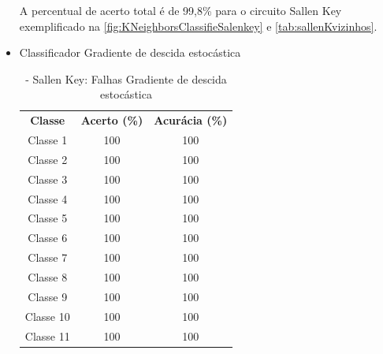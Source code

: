 \begin{itemize}
A percentual de acerto total é de 99,8\% para o circuito Sallen Key exemplificado na \ref{fig:KNeighborsClassifieSalenkey} e \ref{tab:sallenKvizinhos}. 
\newpage

 \item Classificador Gradiente de descida estocástica
 
 \begin{table}[ht]
\centering
\begin{tabular}{ccc}
\textbf{Classe} & \textbf{Acerto (\%)} & \textbf{Acurácia (\%)} \\
Classe 1        & 100                  & 100                    \\
Classe 2        & 100                  & 100                    \\
Classe 3        & 100                  & 100                    \\
Classe 4        & 100                  & 100                    \\
Classe 5        & 100                  & 100                    \\
Classe 6        & 100                  & 100                    \\
Classe 7        & 100                  & 100                    \\
Classe 8        & 100                  & 100                    \\
Classe 9        & 100                  & 100                    \\
Classe 10       & 100                  & 100                    \\
Classe 11       & 100                  & 100                                   
\end{tabular}
\caption{\label{tab:sallenGDE}- Sallen Key: Falhas Gradiente de descida estocástica}
\end{table}


\end{itemize}
